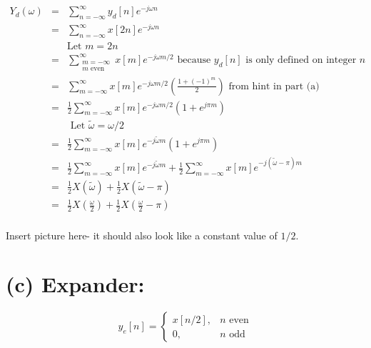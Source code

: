 \documentclass[11pt]{article}
\begin{document}
\begin{eqnarray*}
Y_d(\omega) &=& \sum_{n=-\infty}^\infty y_d[n]e^{-j\omega n} \\
&=& \sum_{n=-\infty}^\infty x[2n]e^{-j\omega n} \\
&& \text{Let } m =2n \\
&=& \sum_{\substack{m=-\infty \\ m \text{ even}}}^\infty x[m]e^{-j\omega m/2} \text{ because } y_d[n] \text{ is only defined on integer } n\\
&=& \sum_{m=-\infty}^\infty x[m]e^{-j\omega m/2} \left(\frac{1+(-1)^m}{2}\right) \text{ from hint in part (a) } \\
&=& \frac{1}{2}\sum_{m=-\infty}^\infty x[m]e^{-j\omega m/2} \left(1+e^{j \pi m}\right) \\
&& \text{ Let } \tilde{\omega} = \omega/2 \\
&=& \frac{1}{2}\sum_{m=-\infty}^\infty x[m]e^{-j\tilde{\omega}  m} \left(1+e^{j \pi m}\right) \\
&=& \frac{1}{2}\sum_{m=-\infty}^\infty x[m]e^{-j\tilde{\omega}  m} + \frac{1}{2}\sum_{m=-\infty}^\infty x[m]e^{-j(\tilde{\omega} -\pi) m}\\
&=& \frac{1}{2}X(\tilde{\omega}) +\frac{1}{2}X(\tilde{\omega}-\pi) \\
&=& \frac{1}{2}X\left(\frac{\omega}{2}\right) +\frac{1}{2}X\left(\frac{\omega}{2}-\pi \right) \\
\end{eqnarray*}

Insert picture here- it should also look like a constant value of $1/2$.

\section*{(c) Expander: }
\begin{equation*}
y_e[n] = \begin{cases}
x[n/2], & n \text{ even} \\
0, & n \text{ odd}
\end{cases}
\end{equation*}
\end{document}
